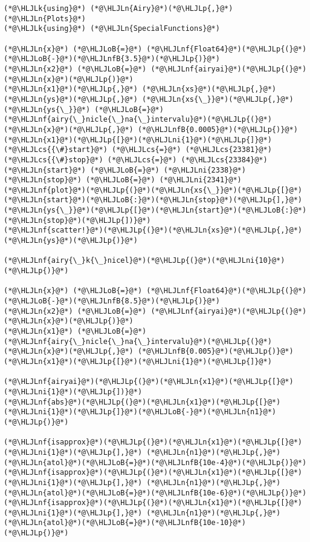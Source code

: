 \documentclass[12pt,a4paper]{article}
\newcommand{\HLJLk}[1]{\textcolor[RGB]{148,91,176}{\textbf{#1}}}
\newcommand{\HLJLn}[1]{#1}
\newcommand{\HLJLnf}[1]{\textcolor[RGB]{66,102,213}{#1}}
\newcommand{\HLJLnfB}[1]{\textcolor[RGB]{59,151,46}{#1}}
\newcommand{\HLJLni}[1]{\textcolor[RGB]{59,151,46}{#1}}
\newcommand{\HLJLoB}[1]{\textcolor[RGB]{102,102,102}{\textbf{#1}}}
\newcommand{\HLJLp}[1]{#1}
\newcommand{\HLJLcs}[1]{\textcolor[RGB]{153,153,119}{\textit{#1}}}
\begin{document}
\begin{lstlisting}
(*@\HLJLk{using}@*) (*@\HLJLn{Airy}@*)(*@\HLJLp{,}@*) (*@\HLJLn{Plots}@*)
(*@\HLJLk{using}@*) (*@\HLJLn{SpecialFunctions}@*)

(*@\HLJLn{x}@*) (*@\HLJLoB{=}@*) (*@\HLJLnf{Float64}@*)(*@\HLJLp{(}@*)(*@\HLJLoB{-}@*)(*@\HLJLnfB{3.5}@*)(*@\HLJLp{)}@*)
(*@\HLJLn{x2}@*) (*@\HLJLoB{=}@*) (*@\HLJLnf{airyai}@*)(*@\HLJLp{(}@*)(*@\HLJLn{x}@*)(*@\HLJLp{)}@*)
(*@\HLJLn{x1}@*)(*@\HLJLp{,}@*) (*@\HLJLn{xs}@*)(*@\HLJLp{,}@*) (*@\HLJLn{ys}@*)(*@\HLJLp{,}@*) (*@\HLJLn{xs{\_}}@*)(*@\HLJLp{,}@*) (*@\HLJLn{ys{\_}}@*) (*@\HLJLoB{=}@*) (*@\HLJLnf{airy{\_}nicle{\_}na{\_}intervalu}@*)(*@\HLJLp{(}@*)(*@\HLJLn{x}@*)(*@\HLJLp{,}@*) (*@\HLJLnfB{0.0005}@*)(*@\HLJLp{)}@*)
(*@\HLJLn{x1}@*)(*@\HLJLp{[}@*)(*@\HLJLni{1}@*)(*@\HLJLp{]}@*)
(*@\HLJLcs{{\#}start}@*) (*@\HLJLcs{=}@*) (*@\HLJLcs{23381}@*)
(*@\HLJLcs{{\#}stop}@*) (*@\HLJLcs{=}@*) (*@\HLJLcs{23384}@*)
(*@\HLJLn{start}@*) (*@\HLJLoB{=}@*) (*@\HLJLni{2338}@*)
(*@\HLJLn{stop}@*) (*@\HLJLoB{=}@*) (*@\HLJLni{2341}@*)
(*@\HLJLnf{plot}@*)(*@\HLJLp{(}@*)(*@\HLJLn{xs{\_}}@*)(*@\HLJLp{[}@*)(*@\HLJLn{start}@*)(*@\HLJLoB{:}@*)(*@\HLJLn{stop}@*)(*@\HLJLp{],}@*) (*@\HLJLn{ys{\_}}@*)(*@\HLJLp{[}@*)(*@\HLJLn{start}@*)(*@\HLJLoB{:}@*)(*@\HLJLn{stop}@*)(*@\HLJLp{])}@*)
(*@\HLJLnf{scatter!}@*)(*@\HLJLp{(}@*)(*@\HLJLn{xs}@*)(*@\HLJLp{,}@*) (*@\HLJLn{ys}@*)(*@\HLJLp{)}@*)

(*@\HLJLnf{airy{\_}k{\_}nicel}@*)(*@\HLJLp{(}@*)(*@\HLJLni{10}@*)(*@\HLJLp{)}@*)

(*@\HLJLn{x}@*) (*@\HLJLoB{=}@*) (*@\HLJLnf{Float64}@*)(*@\HLJLp{(}@*)(*@\HLJLoB{-}@*)(*@\HLJLnfB{8.5}@*)(*@\HLJLp{)}@*)
(*@\HLJLn{x2}@*) (*@\HLJLoB{=}@*) (*@\HLJLnf{airyai}@*)(*@\HLJLp{(}@*)(*@\HLJLn{x}@*)(*@\HLJLp{)}@*)
(*@\HLJLn{x1}@*) (*@\HLJLoB{=}@*) (*@\HLJLnf{airy{\_}nicle{\_}na{\_}intervalu}@*)(*@\HLJLp{(}@*)(*@\HLJLn{x}@*)(*@\HLJLp{,}@*) (*@\HLJLnfB{0.005}@*)(*@\HLJLp{)}@*)
(*@\HLJLn{x1}@*)(*@\HLJLp{[}@*)(*@\HLJLni{1}@*)(*@\HLJLp{]}@*)

(*@\HLJLnf{airyai}@*)(*@\HLJLp{(}@*)(*@\HLJLn{x1}@*)(*@\HLJLp{[}@*)(*@\HLJLni{1}@*)(*@\HLJLp{])}@*)
(*@\HLJLnf{abs}@*)(*@\HLJLp{(}@*)(*@\HLJLn{x1}@*)(*@\HLJLp{[}@*)(*@\HLJLni{1}@*)(*@\HLJLp{]}@*)(*@\HLJLoB{-}@*)(*@\HLJLn{n1}@*)(*@\HLJLp{)}@*)

(*@\HLJLnf{isapprox}@*)(*@\HLJLp{(}@*)(*@\HLJLn{x1}@*)(*@\HLJLp{[}@*)(*@\HLJLni{1}@*)(*@\HLJLp{],}@*) (*@\HLJLn{n1}@*)(*@\HLJLp{,}@*) (*@\HLJLn{atol}@*)(*@\HLJLoB{=}@*)(*@\HLJLnfB{10e-4}@*)(*@\HLJLp{)}@*)
(*@\HLJLnf{isapprox}@*)(*@\HLJLp{(}@*)(*@\HLJLn{x1}@*)(*@\HLJLp{[}@*)(*@\HLJLni{1}@*)(*@\HLJLp{],}@*) (*@\HLJLn{n1}@*)(*@\HLJLp{,}@*) (*@\HLJLn{atol}@*)(*@\HLJLoB{=}@*)(*@\HLJLnfB{10e-6}@*)(*@\HLJLp{)}@*)
(*@\HLJLnf{isapprox}@*)(*@\HLJLp{(}@*)(*@\HLJLn{x1}@*)(*@\HLJLp{[}@*)(*@\HLJLni{1}@*)(*@\HLJLp{],}@*) (*@\HLJLn{n1}@*)(*@\HLJLp{,}@*) (*@\HLJLn{atol}@*)(*@\HLJLoB{=}@*)(*@\HLJLnfB{10e-10}@*)(*@\HLJLp{)}@*)
\end{lstlisting}
\end{document}

